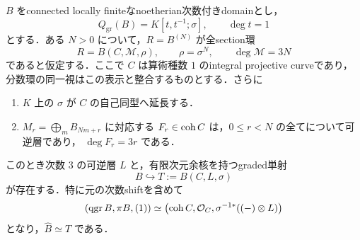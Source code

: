 \documentclass[11pt,a4paper]{ltjsarticle}
\begin{document}
\begin{proposition}[可逆な剰余層によるheart復元判定]
\label{prop:v10-invertible-residue-reconstruction}
$B$ をconnected locally finiteなnoetherian次数付きdomainとし，
\[
 Q_{\mathrm{gr}}(B)=K[t,t^{-1};\sigma],\qquad \deg t=1
\]
とする．ある $N>0$ について，$R=B^{(N)}$ が全section環
\[
 R=B(C,\mathcal M,\rho),\qquad \rho=\sigma^N,
 \qquad\deg\mathcal M=3N
\]
であると仮定する．ここで $C$ は算術種数 $1$ のintegral projective curveであり，
分数環の同一視はこの表示と整合するものとする．さらに
\begin{enumerate}
\item $K$ 上の $\sigma$ が $C$ の自己同型へ延長する．
\item $M_r=\bigoplus_m B_{Nm+r}$ に対応する
      $F_r\in\operatorname{coh} C$ は，$0\le r<N$ の全てについて可逆層であり，
      $\deg F_r=3r$ である．
\end{enumerate}
このとき次数 $3$ の可逆層 $L$ と，有限次元余核を持つgraded単射
\[
 B\hookrightarrow T:=B(C,L,\sigma)
\]
が存在する．特に元の次数shiftを含めて
\[
 (\operatorname{qgr} B,\pi B,(1))
 \simeq
 \bigl(\operatorname{coh} C,\mathcal O_C,
       \sigma^{-1*}((- )\otimes L)\bigr)
\]
となり，$\widehat B\simeq T$ である．
\end{proposition}
\end{document}

